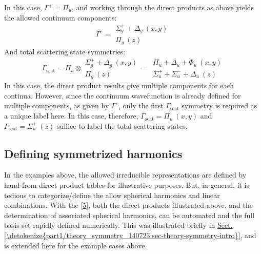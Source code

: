 \documentclass[letterpaper,table,10pt,english]{jupyterBook}
\begin{document}
\sphinxAtStartPar
In this case, \(\Gamma^{+} = \Pi_u\), and \sphinxhyphen{} working through the direct products as above \sphinxhyphen{} yields the allowed continuum components:
\label{equation:part2/sym-fitting-intro_240723:2ff202bb-b8a6-4649-a827-30e66a244c3a}\begin{equation}
\Gamma^{e}=\begin{array}{c}
\Sigma_{g}^{+} + \Delta_{g}~(x,y)\\
\Pi_{g}~(z)
\end{array}
\end{equation}
\sphinxAtStartPar
And total scattering state symmetries:
\label{equation:part2/sym-fitting-intro_240723:19471e63-194f-450f-bdb9-2df4a3bbb59f}\begin{equation}
\Gamma_{\mathrm{scat}}=\Pi_{u}\otimes\begin{array}{c}
\Sigma_{g}^{+} + \Delta_{g}~(x,y)\\
\Pi_{g}~(z)
\end{array}=\begin{array}{c}
\Pi_{u} + \Delta_{u} + \Phi_{u}~(x,y)\\
\Sigma_{u}^{+} + \Sigma_{u}^{-} + \Delta_{u}~(z)
\end{array}
\end{equation}
\sphinxAtStartPar
In this case, the direct product results give multiple components for each continua. However, since the continuum wavefunction is already defined for multiple components, as given by \(\Gamma^{e}\), only the first \(\Gamma_{\mathrm{scat}}\) symmetry is required as a unique label here. In this case, therefore, \(\Gamma_{\mathrm{scat}} = \Pi_{u}~(x,y)\) and \(\Gamma_{\mathrm{scat}} =\Sigma_{u}^{+}~(z)\) suffice to label the total scattering states.


\subsection{Defining symmetrized harmonics}
\label{\detokenize{part2/sym-fitting-intro_240723:defining-symmetrized-harmonics}}
\sphinxAtStartPar
In the examples above, the allowed irreducible representations are defined by hand from direct product tables for illustrative purposes. But, in general, it is tedious to categorize/define the allow spherical harmonics and linear combinations. With the  {[}\hyperlink{cite.backmatter/bibliography:id680}{5}{]}, both the direct products illustrated above, and the determination of associated spherical harmonics, can be automated and the full basis set rapidly defined numerically. This was illustrated briefly in \hyperref[\detokenize{part1/theory_symmetry_140723:sec-theory-symmetry-intro}]{Sect.\@ \ref{\detokenize{part1/theory_symmetry_140723:sec-theory-symmetry-intro}}}, and is extended here for the example cases above.
\end{document}
